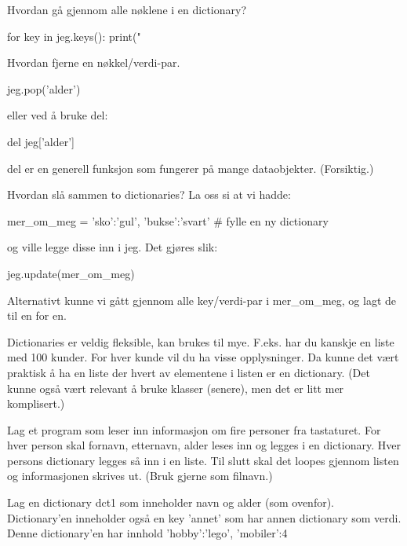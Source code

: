{Hvordan gå gjennom alle nøklene i en dictionary?
\begin{usncodebox}
for key in jeg.keys():
   print("  %
\end{usncodebox}

Hvordan fjerne en nøkkel/verdi-par. 
\begin{usncodebox}
jeg.pop('alder')
\end{usncodebox}

eller ved å bruke del: 
\begin{usncodebox}
del jeg['alder']
\end{usncodebox}

del er en generell funksjon som fungerer på mange dataobjekter. (Forsiktig.) 

Hvordan slå sammen to dictionaries?
La oss si at vi hadde:
\begin{usncodebox}
mer_om_meg = {'sko':'gul', 'bukse':'svart'}   # fylle en ny dictionary
\end{usncodebox}
og ville legge disse inn i jeg. Det gjøres slik:
\begin{usncodebox}
jeg.update(mer_om_meg)
\end{usncodebox}
Alternativt kunne vi gått gjennom alle key/verdi-par i mer\_{}om\_{}meg, og lagt de til en for en.

Dictionaries er veldig fleksible, kan brukes til mye. F.eks. har du kanskje en liste med 100 kunder. For hver kunde vil du ha visse opplysninger. Da kunne det vært praktisk å ha en liste der hvert av elementene i listen er en dictionary. (Det kunne også vært relevant å bruke klasser (senere), men det er litt mer komplisert.)

\begin{question}
Lag et program som leser inn informasjon om fire personer fra tastaturet. For hver person skal fornavn, etternavn, alder leses inn og legges i en dictionary. Hver persons dictionary legges så inn i en liste. Til slutt skal det loopes gjennom listen og informasjonen skrives ut. (Bruk gjerne  som filnavn.)
\end{question} 

\begin{question}
Lag en dictionary dct1 som inneholder navn og alder (som ovenfor). Dictionary'en inneholder også en key 'annet' som har annen dictionary som verdi. Denne dictionary'en har innhold {'hobby':'lego', 'mobiler':4}
\end{question}

}
